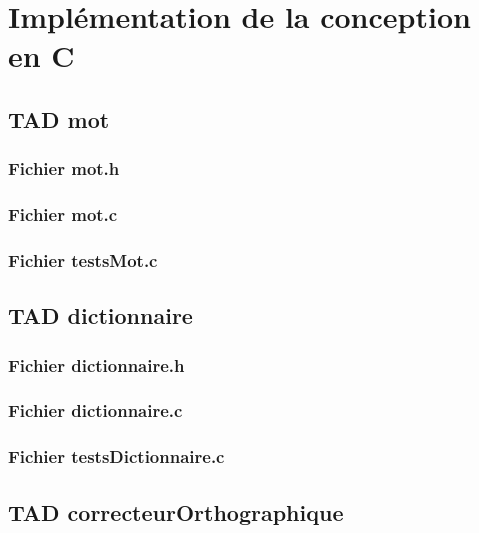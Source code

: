 \section{Implémentation de la conception en C}
	\subsection{TAD mot}
		\subsubsection{Fichier mot.h}
			
			
		\subsubsection{Fichier mot.c}
			
		\subsubsection{Fichier testsMot.c}
			

	\subsection{TAD dictionnaire}
		\subsubsection{Fichier dictionnaire.h}
			
			
		\subsubsection{Fichier dictionnaire.c}
			
		\subsubsection{Fichier testsDictionnaire.c}
			

	\subsection{TAD correcteurOrthographique}
